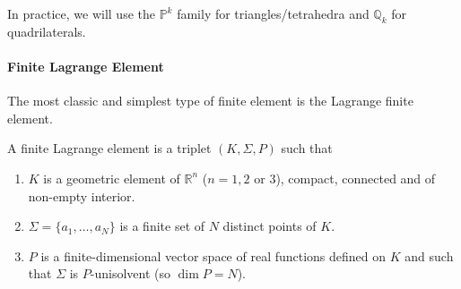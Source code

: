 \begin{Rem}
	In practice, we will use the $\mathbb{P}^k$ family for triangles/tetrahedra and $\mathbb{Q}_k$ for quadrilaterals.
\end{Rem}

\paragraph{Finite Lagrange Element}

The most classic and simplest type of finite element is the Lagrange finite element.

\begin{Def}
	A finite Lagrange element is a triplet $(K,\Sigma,P)$ such that 
	\begin{enumerate}[label=\textbullet]
		\item $K$ is a geometric element of $\mathbb{R}^n$ ($n=1,2$ or $3$), compact, connected and of non-empty interior.
		\item $\Sigma=\{a_1,\dots,a_N\}$ is a finite set of $N$ distinct points of $K$.
		\item $P$ is a finite-dimensional vector space of real functions defined on $K$ and such that $\Sigma$ is $P$-unisolvent (so $\dim P=N$).
	\end{enumerate}
\end{Def}

